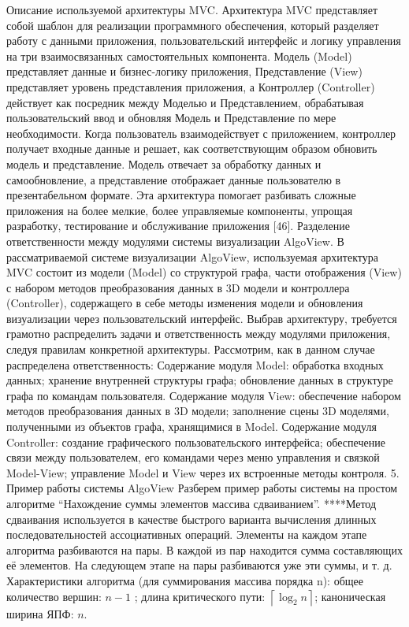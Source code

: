 Описание используемой архитектуры MVC.
Архитектура MVC представляет собой шаблон для реализации программного обеспечения, который разделяет работу с данными приложения, пользовательский интерфейс и логику управления на три взаимосвязанных самостоятельных компонента. Модель (Model) представляет данные и бизнес-логику приложения, Представление (View) представляет уровень представления приложения, а Контроллер (Controller) действует как посредник между Моделью и Представлением, обрабатывая пользовательский ввод и обновляя Модель и Представление по мере необходимости. Когда пользователь взаимодействует с приложением, контроллер получает входные данные и решает, как соответствующим образом обновить модель и представление. Модель отвечает за обработку данных и самообновление, а представление отображает данные пользователю в презентабельном формате. Эта архитектура помогает разбивать сложные приложения на более мелкие, более управляемые компоненты, упрощая разработку, тестирование и обслуживание приложения [46].
Разделение ответственности между модулями системы визуализации AlgoView.
В рассматриваемой системе визуализации AlgoView, используемая архитектура MVC состоит из модели (Model) со структурой графа, части отображения (View) с набором методов преобразования данных в 3D модели и контроллера (Controller), содержащего в себе методы изменения модели и обновления визуализации через пользовательский интерфейс. Выбрав архитектуру, требуется грамотно распределить задачи и ответственность между модулями приложения, следуя правилам конкретной архитектуры. Рассмотрим, как в данном случае распределена ответственность:
Содержание модуля Model: обработка входных данных; хранение внутренней структуры графа; обновление данных в структуре графа по командам пользователя.
Содержание модуля View: обеспечение набором методов преобразования данных в 3D модели; заполнение сцены 3D моделями, полученными из объектов графа, хранящимися в Model.
Содержание модуля Controller: создание графического пользовательского интерфейса; обеспечение связи между пользователем, его командами через меню управления и связкой Model-View; управление Model и View через их встроенные методы контроля.
5. Пример работы системы AlgoView
Разберем пример работы системы на простом алгоритме “Нахождение суммы элементов массива сдваиванием”. ****Метод сдваивания используется в качестве быстрого варианта вычисления длинных последовательностей ассоциативных операций. Элементы на каждом этапе алгоритма разбиваются на пары. В каждой из пар находится сумма составляющих её элементов. На следующем этапе на пары разбиваются уже эти суммы, и т. д. Характеристики алгоритма (для суммирования массива порядка n): общее количество вершин: $n - 1$ ; длина критического пути: $\left\lceil{\log_2n}\right\rceil$; каноническая ширина ЯПФ: $n$.

